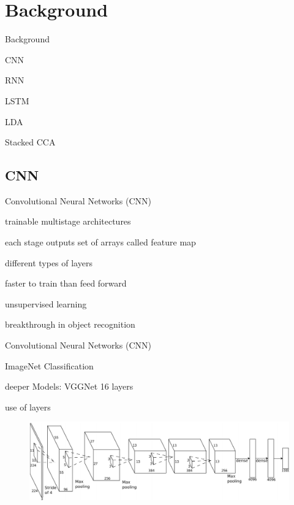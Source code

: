 \documentclass[16pt]{beamer}
\newenvironment{wideitemize}{\itemize\addtolength{\itemsep}{10pt}}{\enditemize}
\begin{document}
\section{Background} 
\begin{frame}{Background}
\begin{wideitemize}
\item CNN
\item RNN
\item LSTM
\item LDA
\item Stacked CCA
\end{wideitemize}
\end{frame}

\subsection{CNN}%
\begin{frame}{Convolutional Neural Networks (CNN)}
\begin{wideitemize}
\item trainable multistage architectures
\item each stage outputs set of arrays called feature map
\item different types of layers
\item faster to train than feed forward
\item unsupervised learning
\item breakthrough in object recognition

\end{wideitemize}
\end{frame}

\begin{frame}{Convolutional Neural Networks (CNN)}
\begin{wideitemize}
\item ImageNet Classification 
\item deeper Models: VGGNet 16 layers
\item use of layers
\begin{figure}[tb]
           \centering
           \includegraphics[width=\linewidth]{cnn.PNG}
\\\cite{Krizhevsky2012a}
           \end{figure}

\end{wideitemize}
\end{frame}
\end{document}
